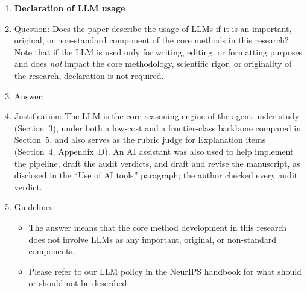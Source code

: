 \begin{enumerate}
\item {\bf Declaration of LLM usage}
    \item[] Question: Does the paper describe the usage of LLMs if it is an important, original, or non-standard component of the core methods in this research? Note that if the LLM is used only for writing, editing, or formatting purposes and does \emph{not} impact the core methodology, scientific rigor, or originality of the research, declaration is not required.
    \item[] Answer: \answerYes{}
    \item[] Justification: The LLM is the core reasoning engine of the agent under study (Section~3), under both a low-cost and a frontier-class backbone compared in Section~5, and also serves as the rubric judge for Explanation items (Section~4, Appendix~D). An AI assistant was also used to help implement the pipeline, draft the audit verdicts, and draft and revise the manuscript, as disclosed in the ``Use of AI tools'' paragraph; the author checked every audit verdict.
    \item[] Guidelines:
    \begin{itemize}
        \item The answer \answerNA{} means that the core method development in this research does not involve LLMs as any important, original, or non-standard components.
        \item Please refer to our LLM policy in the NeurIPS handbook for what should or should not be described.
    \end{itemize}

\end{enumerate}